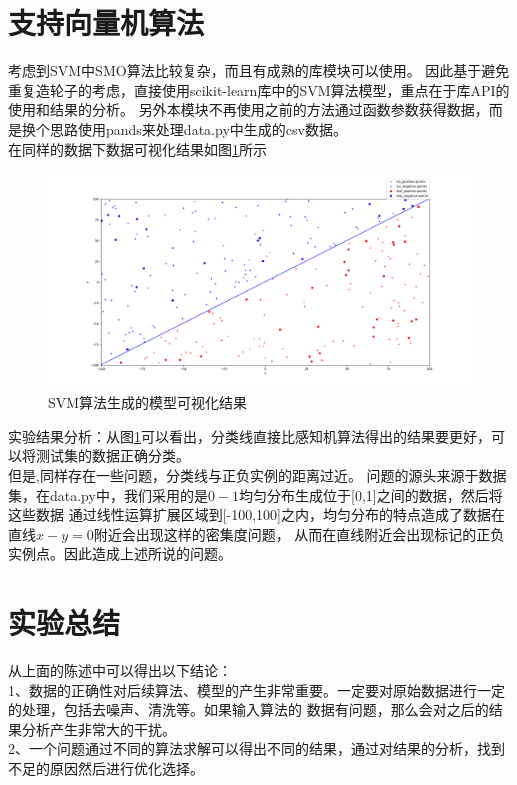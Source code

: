 \documentclass[UTF8,twoside,fontset=none,heading=true,scheme=chinese]{ctexart}
\begin{document}
    \section{支持向量机算法}
    \noindent 考虑到SVM中SMO算法比较复杂，而且有成熟的库模块可以使用。
    因此基于避免重复造轮子的考虑，直接使用scikit-learn库中的SVM算法模型，重点在于库API的使用和结果的分析。
    另外本模块不再使用之前的方法通过函数参数获得数据，而是换个思路使用pands来处理data.py中生成的csv数据。\\
    在同样的数据下数据可视化结果如图\ref{fig:svm}所示
    \begin{figure}[htb]
        \centering
        \includegraphics[scale=0.4]{../svm_model.png}
        \caption{SVM算法生成的模型可视化结果}
        \label{fig:svm}
    \end{figure}
    实验结果分析：从图\ref{fig:svm}可以看出，分类线直接比感知机算法得出的结果要更好，可以将测试集的数据正确分类。\\
    但是,同样存在一些问题，分类线与正负实例的距离过近。
    问题的源头来源于数据集，在data.py中，我们采用的是$0-1$均匀分布生成位于[0,1]之间的数据，然后将这些数据
    通过线性运算扩展区域到[-100,100]之内，均匀分布的特点造成了数据在直线$x-y=0$附近会出现这样的密集度问题，
    从而在直线附近会出现标记的正负实例点。因此造成上述所说的问题。

    \section{实验总结}
    \noindent 从上面的陈述中可以得出以下结论：\\
    1、数据的正确性对后续算法、模型的产生非常重要。一定要对原始数据进行一定的处理，包括去噪声、清洗等。如果输入算法的
    数据有问题，那么会对之后的结果分析产生非常大的干扰。\\
    2、一个问题通过不同的算法求解可以得出不同的结果，通过对结果的分析，找到不足的原因然后进行优化选择。
\end{document}
